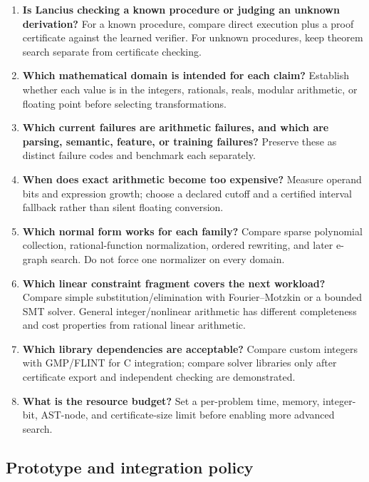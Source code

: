 \documentclass[
  10pt,
]{article}
\providecommand{\tightlist}{%
  \setlength{\itemsep}{0pt}\setlength{\parskip}{0pt}}
\begin{document}
\begin{enumerate}
\def\labelenumi{\arabic{enumi}.}
\tightlist
\item
  \textbf{Is Lancius checking a known procedure or judging an unknown
  derivation?} For a known procedure, compare direct execution plus a
  proof certificate against the learned verifier. For unknown
  procedures, keep theorem search separate from certificate checking.
\item
  \textbf{Which mathematical domain is intended for each claim?}
  Establish whether each value is in the integers, rationals, reals,
  modular arithmetic, or floating point before selecting
  transformations.
\item
  \textbf{Which current failures are arithmetic failures, and which are
  parsing, semantic, feature, or training failures?} Preserve these as
  distinct failure codes and benchmark each separately.
\item
  \textbf{When does exact arithmetic become too expensive?} Measure
  operand bits and expression growth; choose a declared cutoff and a
  certified interval fallback rather than silent floating conversion.
\item
  \textbf{Which normal form works for each family?} Compare sparse
  polynomial collection, rational-function normalization, ordered
  rewriting, and later e-graph search. Do not force one normalizer on
  every domain.
\item
  \textbf{Which linear constraint fragment covers the next workload?}
  Compare simple substitution/elimination with Fourier--Motzkin or a
  bounded SMT solver. General integer/nonlinear arithmetic has different
  completeness and cost properties from rational linear arithmetic.
\item
  \textbf{Which library dependencies are acceptable?} Compare custom
  integers with GMP/FLINT for C integration; compare solver libraries
  only after certificate export and independent checking are
  demonstrated.
\item
  \textbf{What is the resource budget?} Set a per-problem time, memory,
  integer-bit, AST-node, and certificate-size limit before enabling more
  advanced search.
\end{enumerate}

\subsection{Prototype and integration
policy}\label{prototype-and-integration-policy}
\end{document}
